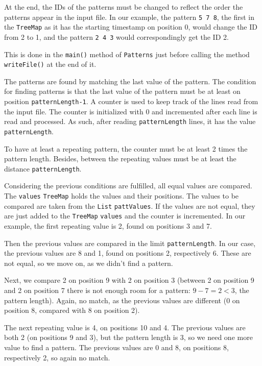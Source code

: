 \documentclass[a4paper,12pt]{article}
\begin{document}
  At the end, the IDs of the patterns must be changed to reflect the order the patterns appear in
  the input file. In our example, the pattern \verb/5 7 8/, the first in the \verb/TreeMap/ as it
  has the starting timestamp on position 0, would change the ID from 2 to 1, and the pattern
  \verb/2 4 3/ would correspondingly get the ID 2.
  
  This is done in the \verb/main()/ method of \verb/Patterns/ just before calling the method
  \verb/writeFile()/ at the end of it.
  
  The patterns are found by matching the last value of the pattern. The condition for finding
  patterns is that the last value of the pattern must be at least on position \verb/patternLength-1/.
  A counter is used to keep track of the lines read from the input file.
  The counter is initialized with 0 and incremented after each line is read and processed.
  As such, after reading \verb/patternLength/ lines, it has the value \verb/patternLength/.
  
  To have at least a repeating pattern, the counter must be at least 2 times the pattern length.
  Besides, between the repeating values must be at least the distance \verb/patternLength/.
  
  Considering the previous conditions are fulfilled, all equal values are compared.
  The \verb/values/ \verb/TreeMap/ holds the values and their positions.
  The values to be compared are taken from the \verb/List/ \verb/pattValues/.
  If the values are not equal, they are just added to the \verb/TreeMap/ \verb/values/ and
  the counter is incremented.
  In our example, the first repeating value is 2, found on positions 3 and 7.
  
  Then the previous values are compared in the limit \verb/patternLength/. In our case,
  the previous values are 8 and 1, found on positions 2, respectively 6. These are not equal,
  so we move on, as we didn't find a pattern. 
 
  Next, we compare 2 on position 9 with 2 on position 3 (between 2 on position 9 and 2 on
  position 7 there is not enough room for a pattern: $9-7=2<3$, the pattern length).
  Again, no match, as the previous values are different (0 on position 8, compared with 8 on
  position 2).
  
  The next repeating value is 4, on positions 10 and 4. The previous values are both 2 (on
  positions 9 and 3), but the pattern length is 3, so we need one more value to find a pattern.
  The previous values are 0 and 8, on positions 8, respectively 2, so again no match.
  
\end{document}

